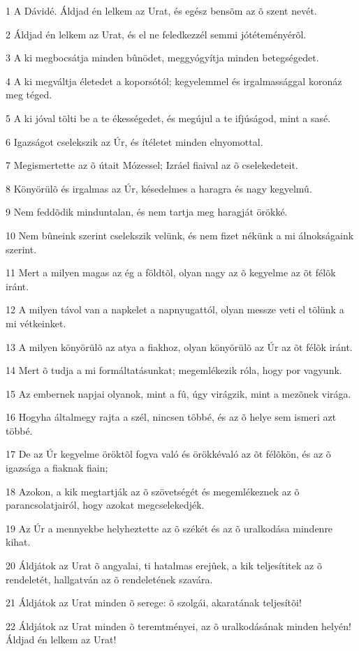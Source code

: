 \par 1 A Dávidé. Áldjad én lelkem az Urat, és egész bensõm az õ szent nevét.
\par 2 Áldjad én lelkem az Urat, és el ne feledkezzél semmi jótéteményérõl.
\par 3 A ki megbocsátja minden bûnödet, meggyógyítja minden betegségedet.
\par 4 A ki megváltja életedet a koporsótól; kegyelemmel és irgalmassággal koronáz meg téged.
\par 5 A ki jóval tölti be a te ékességedet, és megújul a te ifjúságod, mint a sasé.
\par 6 Igazságot cselekszik az Úr, és ítéletet minden elnyomottal.
\par 7 Megismertette az õ útait Mózessel; Izráel fiaival az õ cselekedeteit.
\par 8 Könyörülõ és irgalmas az Úr, késedelmes a haragra és nagy kegyelmû.
\par 9 Nem feddõdik minduntalan, és nem tartja meg haragját örökké.
\par 10 Nem bûneink szerint cselekszik velünk, és nem fizet nékünk a mi álnokságaink szerint.
\par 11 Mert a milyen magas az ég a földtõl, olyan nagy az õ kegyelme az õt félõk iránt.
\par 12 A milyen távol van a napkelet a napnyugattól, olyan messze veti el tõlünk a mi vétkeinket.
\par 13 A milyen könyörülõ az atya a fiakhoz, olyan könyörülõ az Úr az õt félõk iránt.
\par 14 Mert õ tudja a mi formáltatásunkat; megemlékezik róla, hogy por vagyunk.
\par 15 Az embernek napjai olyanok, mint a fû, úgy virágzik, mint a mezõnek virága.
\par 16 Hogyha általmegy rajta a szél, nincsen többé, és az õ helye sem ismeri azt többé.
\par 17 De az Úr kegyelme öröktõl fogva való és örökkévaló az õt félõkön, és az õ igazsága a fiaknak fiain;
\par 18 Azokon, a kik megtartják az õ szövetségét és megemlékeznek az õ parancsolatjairól, hogy azokat megcselekedjék.
\par 19 Az Úr a mennyekbe helyheztette az õ székét és az õ uralkodása mindenre kihat.
\par 20 Áldjátok az Urat õ angyalai, ti hatalmas erejûek, a kik teljesítitek az õ rendeletét, hallgatván az õ rendeletének szavára.
\par 21 Áldjátok az Urat minden õ serege: õ szolgái, akaratának teljesítõi!
\par 22 Áldjátok az Urat minden õ teremtményei, az õ uralkodásának minden helyén! Áldjad én lelkem az Urat!

